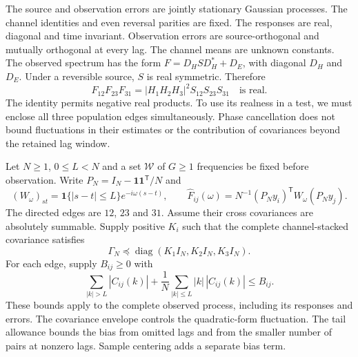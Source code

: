 The source and observation errors are jointly stationary Gaussian processes. The channel identities and even reversal parities are fixed. The responses are real, diagonal and time invariant. Observation errors are source-orthogonal and mutually orthogonal at every lag. The channel means are unknown constants. The observed spectrum has the form $F=D_HS D_H^*+D_E$, with diagonal $D_H$ and $D_E$. Under a reversible source, $S$ is real symmetric. Therefore
\begin{equation}
 F_{12}F_{23}F_{31}=|H_1H_2H_3|^2S_{12}S_{23}S_{31}
 \quad\text{is real}.
 \label{cc16:cancellation}
\end{equation}
The identity permits negative real products. To use its realness in a test, we must enclose all three population edges simultaneously. Phase cancellation does not bound fluctuations in their estimates or the contribution of covariances beyond the retained lag window.

Let $N\ge1$, $0\le L<N$ and a set $\mathcal W$ of $G\ge1$ frequencies be fixed before observation. Write $P_N=I_N-\mathbf1\mathbf1^{\mathsf T}/N$ and
\begin{equation}
 (W_\omega)_{st}=\mathbf1\{|s-t|\le L\}e^{-i\omega(s-t)},
 \qquad
 \widehat F_{ij}(\omega)=N^{-1}(P_Ny_i)^{\mathsf T}W_\omega(P_Ny_j).
 \label{cc16:estimator}
\end{equation}
The directed edges are $12$, $23$ and $31$. Assume their cross covariances are absolutely summable. Supply positive $K_i$ such that the complete channel-stacked covariance satisfies
\begin{equation}
 \Gamma_N\preceq\operatorname{diag}(K_1I_N,K_2I_N,K_3I_N).
 \label{cc16:full-envelope}
\end{equation}
For each edge, supply $B_{ij}\ge0$ with
\begin{equation}
 \sum_{|k|>L}|C_{ij}(k)|+
 \frac1N\sum_{|k|\le L}|k|\,|C_{ij}(k)|\le B_{ij}.
 \label{cc16:tail}
\end{equation}
These bounds apply to the complete observed process, including its responses and errors. The covariance envelope controls the quadratic-form fluctuation. The tail allowance bounds the bias from omitted lags and from the smaller number of pairs at nonzero lags. Sample centering adds a separate bias term.

